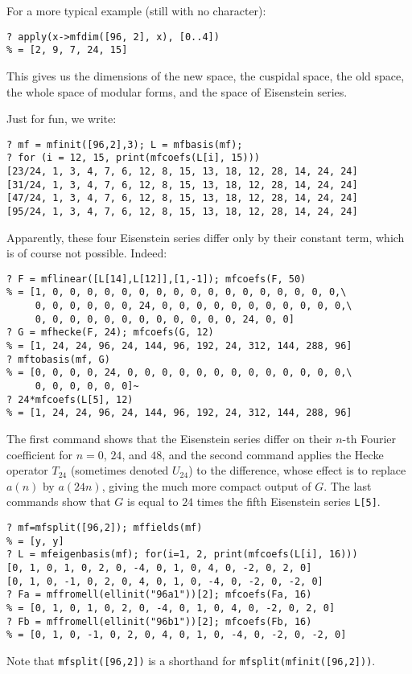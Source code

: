 \documentclass[11pt]{article}
\def\kbd#1{{\tt #1}}
\begin{document}
For a more typical example (still with no character):

\begin{verbatim}
? apply(x->mfdim([96, 2], x), [0..4])
% = [2, 9, 7, 24, 15]
\end{verbatim}

This gives us the dimensions of the new space, the cuspidal space,
the old space, the whole space of modular forms, and the space of Eisenstein
series.

Just for fun, we write:

\begin{verbatim}
? mf = mfinit([96,2],3); L = mfbasis(mf);
? for (i = 12, 15, print(mfcoefs(L[i], 15)))
[23/24, 1, 3, 4, 7, 6, 12, 8, 15, 13, 18, 12, 28, 14, 24, 24]
[31/24, 1, 3, 4, 7, 6, 12, 8, 15, 13, 18, 12, 28, 14, 24, 24]
[47/24, 1, 3, 4, 7, 6, 12, 8, 15, 13, 18, 12, 28, 14, 24, 24]
[95/24, 1, 3, 4, 7, 6, 12, 8, 15, 13, 18, 12, 28, 14, 24, 24]
\end{verbatim}

Apparently, these four Eisenstein series differ only by their constant
term, which is of course not possible. Indeed:

\begin{verbatim}
? F = mflinear([L[14],L[12]],[1,-1]); mfcoefs(F, 50)
% = [1, 0, 0, 0, 0, 0, 0, 0, 0, 0, 0, 0, 0, 0, 0, 0, 0, 0,\
     0, 0, 0, 0, 0, 0, 24, 0, 0, 0, 0, 0, 0, 0, 0, 0, 0, 0,\
     0, 0, 0, 0, 0, 0, 0, 0, 0, 0, 0, 0, 24, 0, 0]
? G = mfhecke(F, 24); mfcoefs(G, 12)
% = [1, 24, 24, 96, 24, 144, 96, 192, 24, 312, 144, 288, 96]
? mftobasis(mf, G)
% = [0, 0, 0, 0, 24, 0, 0, 0, 0, 0, 0, 0, 0, 0, 0, 0, 0, 0,\
     0, 0, 0, 0, 0, 0]~
? 24*mfcoefs(L[5], 12)
% = [1, 24, 24, 96, 24, 144, 96, 192, 24, 312, 144, 288, 96]
\end{verbatim}

The first command shows that the Eisenstein series differ on their $n$-th
Fourier coefficient for $n=0$, $24$, and $48$, and the second command applies
the Hecke operator $T_{24}$ (sometimes denoted $U_{24}$) to the difference,
whose effect is to replace $a(n)$ by $a(24n)$, giving the much more
compact output of $G$. The last commands show that $G$ is equal to
$24$ times the fifth Eisenstein series \kbd{L[5]}.

\begin{verbatim}
? mf=mfsplit([96,2]); mffields(mf)
% = [y, y]
? L = mfeigenbasis(mf); for(i=1, 2, print(mfcoefs(L[i], 16)))
[0, 1, 0, 1, 0, 2, 0, -4, 0, 1, 0, 4, 0, -2, 0, 2, 0]
[0, 1, 0, -1, 0, 2, 0, 4, 0, 1, 0, -4, 0, -2, 0, -2, 0]
? Fa = mffromell(ellinit("96a1"))[2]; mfcoefs(Fa, 16)
% = [0, 1, 0, 1, 0, 2, 0, -4, 0, 1, 0, 4, 0, -2, 0, 2, 0]
? Fb = mffromell(ellinit("96b1"))[2]; mfcoefs(Fb, 16)
% = [0, 1, 0, -1, 0, 2, 0, 4, 0, 1, 0, -4, 0, -2, 0, -2, 0]
\end{verbatim}
Note that \kbd{mfsplit([96,2])} is a shorthand for
\kbd{mfsplit(mfinit([96,2]))}.
\end{document}
